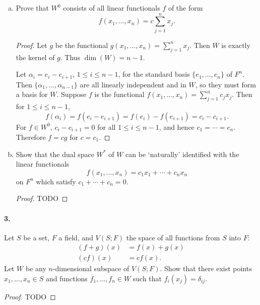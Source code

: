 \documentclass{article}
\begin{document}
\begin{enumerate}[(a)]
  \item Prove that $W^0$ consists of all linear functionals $f$ of the form \[
      f(x_1, \ldots, x_n) = c\sum_{j=1}^n x_j.
    \]
    \begin{proof}
      Let $g$ be the functional $g(x_1, \ldots, x_n) = \sum_{j=1}^n x_j$. Then
      $W$ is exactly the kernel of $g$. Thus $\dim(W) = n - 1$.

      Let $\alpha_i = e_i - e_{i+1}$, $1 \leq i \leq n - 1$, for the standard
      basis $\{e_1, \ldots, e_n\}$ of $F^n$. Then $\{\alpha_1, \ldots,
      \alpha_{n-1}\}$ are all linearly independent and in $W$, so they must form
      a basis for $W$. Suppose $f$ is the functional $f(x_1, \ldots, x_n) =
      \sum_{j=1}^n c_jx_j$. Then for $1 \leq i \leq n - 1$, \[
        f(\alpha_i) = f(e_i - e_{i+1}) = f(e_i) - f(e_{i+1}) = c_i - c_{i+1}.
      \] For $f \in W^0$, $c_i - c_{i+1} = 0$ for all $1 \leq i \leq n - 1$, and
      hence $c_1 = \cdots = c_n$. Therefore $f = cg$ for $c = c_1$.
    \end{proof}
  \item Show that the dual space $W^*$ of $W$ can be `naturally' identified with
    the linear functionals \[
      f(x_1, \ldots, x_n) = c_1x_1 + \cdots + c_nx_n
    \] on $F^n$ which satisfy $c_1 + \cdots + c_n = 0$.
    \begin{proof}
      TODO
    \end{proof}
\end{enumerate}

\paragraph{3.} Let $S$ be a set, $F$ a field, and $V(S; F)$ the space of all
functions from $S$ into $F$:
\begin{align*}
  (f + g)(x) &= f(x) + g(x) \\
  (cf)(x) &= cf(x).
\end{align*}
Let $W$ be any $n$-dimensional subspace of $V(S; F)$. Show that there exist
points $x_1, \ldots, x_n \in S$ and functions $f_1, \ldots, f_n \in W$ such that
$f_i(x_j) = \delta_{ij}$.

\begin{proof}
  TODO
\end{proof}
\end{document}
